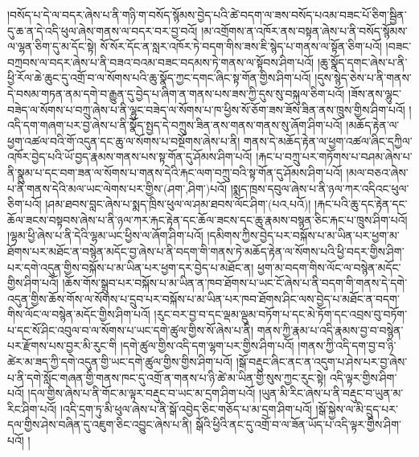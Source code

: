 །བསོད་པ་དེ་ལ་བདར་ཞེས་པ་ནི་གཉི་ག་བསོད་སྙོམས་བྱེད་པའི་ཚེ་བདག་ལ་ཟས་བསོད་པའམ་བཟང་པོ་ཅིག་སྦྱིན་དུ་ཆ་ན་དེ་འདི་ཕུལ་ཞེས་གནས་ལ་བདར་བར་བྱ་བའོ། །མ་འགྲོགས་ན་འཁོར་ནས་བསྟན་ཞེས་པ་ནི་བསོད་སྙོམས་ལ་ལྷན་ཅིག་དུ་མ་དོང་སྟེ། སོ་སོར་དོང་ན་སླར་འཁོར་ཏེ་བདག་གིས་ཟས་ཇི་སྙེད་པ་གནས་ལ་སྟོན་ཅིག་པའོ། །བཟང་བཀྲབས་ལ་བདར་ཞེས་པ་ནི་བཟའ་བའམ་བཟང་བདམས་ཏེ་གནས་ལ་སྟོབས་ཤིག་པའོ། །ཆུ་སྣོད་དགང་ཞེས་པ་ནི་ཕྱི་རོལ་ཆེ་ཆུང་དུ་འགྲོ་བ་ལ་སོགས་པའི་ཆུ་སྣོད་ཀྱང་དགང་ཞིང་སྟ་གོན་གྱིས་ཤིག་པའོ། །དུས་སྙེད་ཅེས་པ་ནི་གནས་དེ་བསམ་གཏན་ནམ་དགེ་བ་རྒྱུན་དུ་བྱེད་པ་ཞིག་ན་གནས་པས་ཟས་ཀྱི་དུས་སུ་བསྐུལ་ཅིག་པའོ། །ཟོས་ནས་ལྷུང་བཟེད་ལ་སོགས་པ་བཀྲུ་ཞེས་པ་ནི་ལྷུང་བཟེད་ལ་སོགས་པ་ཁ་ཕྱིས་སོ་ཅོག་ཟས་ཟོས་ཟིན་ནས་ཁྲུས་གྱིས་ཤིག་པའོ། །འདི་དག་གཞག་པར་བྱ་ཞེས་པ་ནི་སྣོད་སྤྱད་དེ་བཀྲུས་ཟིན་ནས་གནས་གནས་སུ་ཞོག་ཤིག་པའོ། །མཆོད་རྟེན་ལ་ཕྱག་འཚལ་བའི་གོ་འདུན་དང་ཆུ་ལ་སོགས་པ་བསྔོགས་ཞེས་པ་ནི། གནས་དེ་མཆོད་རྟེན་ལ་ཕྱག་འཚལ་ཞིང་དཀྱིལ་འཁོར་བྱེད་པའི་ཡོ་བྱད་རྣམས་གནས་པས་སྟ་གོན་དུ་ཤོམས་ཤིག་པའོ། །རྐང་པ་བཀྲུ་པར་གཏོགས་པ་བཤམ་ཞེས་པ་ནི་སྣུམ་པ་དང་བག་ཟན་ལ་སོགས་པ་གནས་དེའི་རྐང་ལག་བཀྲུ་བའི་སྟ་གོན་དུ་ཤོམས་ཤིག་པའོ། །མལ་བཅའ་ཞེས་པ་ནི་གནས་དེའི་མལ་ཡང་ལེགས་པར་གྱིས་(ཤག་‚ཤིག་)པའོ། །སྨད་ཁྲས་དབུལ་ཞེས་པ་ནི་ཉལ་ཀར་འདིའང་ཕུལ་ཅིག་པའོ། །ཤམ་ཐབས་བླང་ཞེས་པ་སྨད་ཁྲིས་ཕུལ་ལ་ཤམ་ཐབས་ལོང་ཤིག་(པའ‚པའོ)། །རྐང་པའི་ཆུ་དང་རྟེན་དང་ཆོལ་ཟངས་བསྟབས་ཞེས་པ་ནི་ཉལ་ཀར་རྐང་རྟེན་དང་ཆོལ་ཟངས་དང་ཆུ་རྣམས་བསྙན་ཅིང་རྐང་པ་ཁྲུས་ཤིག་པའོ། །ལྷམ་ཕྱི་ཞེས་པ་ནི་དེའི་ལྷམ་ཡང་ཕྱིས་ལ་ཞོག་ཤིག་པའོ། །དམིགས་ཀྱིས་བྱེད་པར་བསྐོས་པ་མ་ཡིན་པར་ཕྱག་མ་ཐོགས་པར་མཐོང་ན་བསྙེན་མདོང་བྱ་ཞེས་པ་ནི་བདག་གི་གནས་ཏེ་མཆོད་རྟེན་ལ་སོགས་པའི་ཕྱི་བདར་གྱིས་ཤིག་པར་དགེ་འདུན་གྱིས་བསྐོས་པ་མ་ཡིན་པར་ཕྱག་དར་བྱེད་པ་མཐོང་ན། ཕྱག་མ་བདག་གིས་ལོང་ལ་བསྙེན་མདོང་གྱིས་ཤིག་པའོ། །ཆོས་གོས་སྒྲུབ་པར་བསྐོས་པ་མ་ཡིན་ན་ཁབ་ཐོགས་པ་ཡང་ངོ་ཞེས་པ་ནི་བདག་གི་གནས་དེ་དགེ་འདུན་གྱིས་ཆོས་གོས་ལ་སོགས་པ་དྲུབ་པར་བསྐོས་པ་མ་ཡིན་པར་ཁབ་ཐོགས་ཤིང་ལས་བྱེད་པ་མཐོང་ན་བདག་གིས་ལོང་ལ་བསྙེན་མདོང་གྱིས་ཤིག་པའོ། །རུང་བར་བྱ་བ་དང་ལྡམ་ལྡུམ་བཏོག་པ་དང་མེ་ཏོག་དང་འབྲས་བུ་བཏོག་པ་དང་སོ་ཤིང་འབུལ་བ་ལ་སོགས་པ་ཡང་དགེ་ཚུལ་གྱིས་སོ་ཞེས་པ་ནི། གནས་ཀྱི་རྣམ་པ་འདི་རྣམས་བྱ་བ་བསྙེན་པར་རྫོགས་པས་བྱར་མི་རུང་གི །དགེ་ཚུལ་གྱིས་འདི་དག་ལྷག་པར་གྱིས་ཤིག་པའོ། །གནས་ཀྱི་འདི་དག་བྱ་བ་ཉི་ཚེར་མ་ཟད་ཀྱི་དགེ་འདུན་གྱི་ཡང་དགེ་ཚུལ་གྱིས་གྱིས་ཤིག་པའོ། །སྒོ་བརྡུང་ཞིང་ནང་ན་འདུག་པ་ཤེས་པར་བྱ་ཞེས་པ་ནི་དགེ་སློང་གཞན་གྱི་གནས་ཁང་དུ་འགྲོ་ན་གནས་པ་ཉི་ཚེ་མ་ཡིན་གྱི་སུས་ཀྱང་རུང་སྟེ། འདི་ལྟར་གྱིས་ཤིག་པའོ། །དལ་གྱིས་ཞེས་པ་ནི་གོང་མ་ལྟར་བརྡུང་བ་ཡང་མ་དྲག་ཤིག་པའོ། །ཡུན་མི་རིང་ཞེས་པ་ནི་བརྡུང་བ་ཡུན་མ་རིང་ཤིག་པའོ། །འདི་དྲག་ཏུ་མི་ཕུལ་ཞེས་པ་ནི་སྒོ་འབྱེད་ཅིང་གཅོད་པ་མ་དྲག་ཤིག་པའོ། །སྒོ་སྐྱེས་ལ་མི་དྲུད་པར་དལ་གྱིས་ཤེས་བཞིན་དུ་འཇུག་ཅིང་འབྱུང་ཞེས་པ་ནི། སྒོའི་ཕྱིའི་ནང་དུ་འགྲོ་བ་ལ་ཟོན་ཡོད་པ་འདི་ལྟར་གྱིས་ཤིག་པའོ། །
